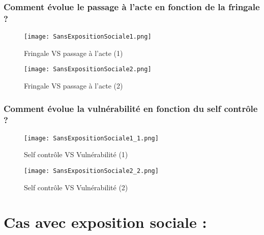 \documentclass{beamer}
\begin{document}
\begin{frame}
	\frametitle{Comment évolue le passage à l'acte en fonction de la fringale ?}
	\begin{minipage}{0.45\linewidth}
		\centering
		\begin{figure}
			\texttt{[image: SansExpositionSociale1.png]}
			\captionsetup{justification=centering, skip=5pt}
			\caption{Fringale VS passage à l'acte (1)}
		\end{figure}
	\end{minipage}\hfill
	\begin{minipage}{0.45\linewidth}
		\centering
		\begin{figure}
			\texttt{[image: SansExpositionSociale2.png]}
			\captionsetup{justification=centering, skip=5pt}
			\caption{Fringale VS passage à l'acte (2)}
		\end{figure}
	\end{minipage}
\end{frame}

\begin{frame}
	\frametitle{Comment évolue la vulnérabilité en fonction du self contrôle ?}
	\begin{minipage}{0.45\linewidth}
		\centering
		\begin{figure}
			\texttt{[image: SansExpositionSociale1\_1.png]}
			\captionsetup{justification=centering, skip=5pt}
			\caption{Self contrôle VS Vulnérabilité (1)}

		\end{figure}
	\end{minipage}\hfill
	\begin{minipage}{0.45\linewidth}
		\centering
		\begin{figure}
			\texttt{[image: SansExpositionSociale2\_2.png]}
			\captionsetup{justification=centering, skip=5pt}
			\caption{Self contrôle VS Vulnérabilité (2)}
		\end{figure}
	\end{minipage}
\end{frame}

\section{Cas avec exposition sociale :}
\end{document}

